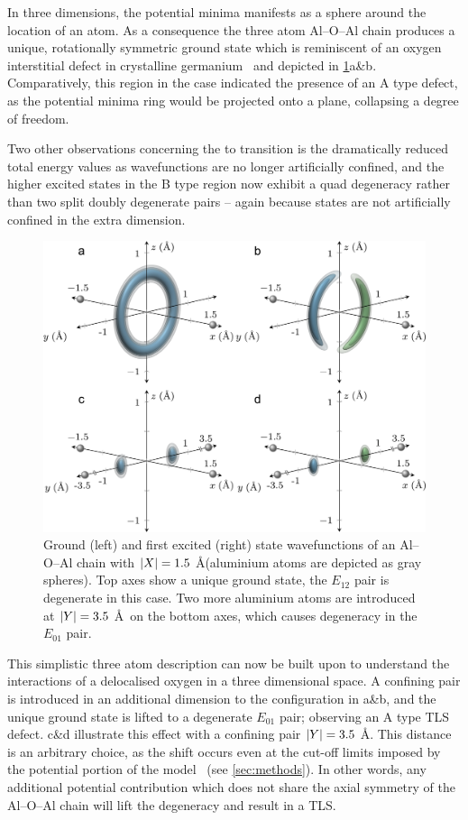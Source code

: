 In three dimensions, the potential minima manifests as a sphere around the location of an atom. As a consequence the three atom Al--O--Al chain produces a unique, rotationally symmetric ground state which is reminiscent of an oxygen interstitial defect in crystalline germanium~\cite{Artacho1995} and depicted in \cref{fig:lift}a\&b.
Comparatively, this region in the  case indicated the presence of an A type defect, as the  potential minima ring would be projected onto a plane, collapsing a degree of freedom.

Two other observations concerning the  to  transition is the dramatically reduced total energy values as wavefunctions are no longer artificially confined, and the higher excited states in the B type region now exhibit a quad degeneracy rather than two split doubly degenerate pairs -- again because states are not artificially confined in the extra dimension.

\begin{figure}[htb]
  \includegraphics[width=\textwidth]{figures/lift}
  \caption{\label{fig:lift}Ground (left) and first excited (right) state wavefunctions of an Al--O--Al chain with $\lvert X\rvert = 1.5$ \AA (aluminium atoms are depicted as gray spheres). Top axes show a unique ground state, the $E_{12}$ pair is degenerate in this case. Two more aluminium atoms are introduced at $\lvert Y\rvert = 3.5$ \AA\ on the bottom axes, which causes degeneracy in the $E_{01}$ pair.}
\end{figure}

This simplistic three atom description can now be built upon to understand the interactions of a delocalised oxygen in a three dimensional space.
A confining pair is introduced in an additional dimension to the configuration in a\&b, and the unique ground state is lifted to a degenerate $E_{01}$ pair; observing an A type TLS defect.
c\&d illustrate this effect with a confining pair $\lvert Y\rvert = 3.5$ \AA.
This distance is an arbitrary choice, as the shift occurs even at the cut-off limits imposed by the potential portion of the model~\cite{Streitz1994} (see \cref{sec:methods}).
In other words, any additional potential contribution which does not share the axial symmetry of the Al--O--Al chain will lift the degeneracy and result in a TLS.

